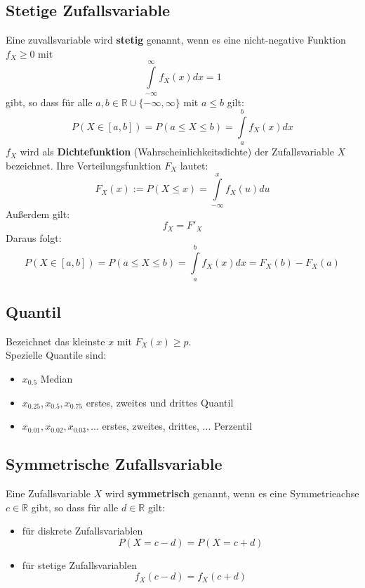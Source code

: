 \documentclass[12pt]{article}
\begin{document}
\subsection{Stetige Zufallsvariable}
Eine zuvallsvariable wird \textbf{stetig} genannt, wenn es eine nicht-negative Funktion $f_X\geq 0$ mit 
\begin{equation}
	\int\limits_{-\infty}^\infty f_X(x) dx = 1
\end{equation}
gibt, so dass für alle $a,b \in \mathbb{R} \cup \{-\infty, \infty\}$ mit $a\leq b$ gilt:
\begin{equation}
	P(X\in [a,b]) = P(a\leq X \leq b) = \int\limits_a^b f_X(x)dx
\end{equation}
$f_X$ wird als \textbf{Dichtefunktion} (Wahrscheinlichkeitsdichte) der Zufallsvariable $X$ bezeichnet.
Ihre Verteilungsfunktion $F_X$ lautet:
\begin{equation}
	F_X(x):=P(X\leq x) = \int\limits_{-\infty}^x f_X(u)du
\end{equation}
Außerdem gilt:
\begin{equation}
	f_X = F'_X
\end{equation}
Daraus folgt:
\begin{equation}
	P(X\in [a,b]) = P(a\leq X \leq b) = \int\limits_a^b f_X(x)dx = F_X(b) - F_X(a)
\end{equation}
\subsection{Quantil}
Bezeichnet das kleinste $x$ mit $F_X(x)\geq p$. \\
Spezielle Quantile sind:
\begin{itemize}
	\item $x_{0.5}$ Median
	\item $x_{0.25}, x_{0.5}, x_{0.75}$ erstes, zweites und drittes Quantil
	\item $x_{0.01}, x_{0.02}, x_{0.03}, ...$ erstes, zweites, drittes, ... Perzentil
\end{itemize}
\subsection{Symmetrische Zufallsvariable}
Eine Zufallsvariable $X$ wird \textbf{symmetrisch} genannt, wenn es eine Symmetrieachse $c \in \mathbb{R}$ gibt, so dass für alle $d\in\mathbb{R}$ gilt:
\begin{itemize}
	\item für diskrete Zufallsvariablen 
	\begin{equation}
		P(X=c-d) = P(X=c+d)
	\end{equation}
	\item für stetige Zufallsvariablen
	\begin{equation}
		f_X(c-d)=f_X(c+d)
	\end{equation}
\end{itemize}
\end{document}
